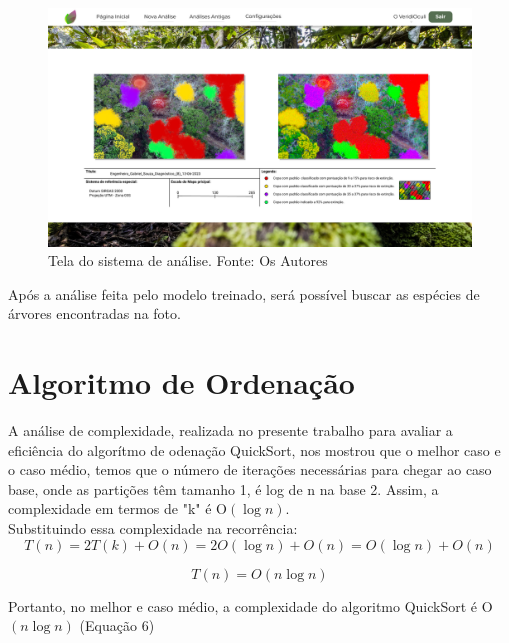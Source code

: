 \documentclass[
  a4paper,%
  12pt,%
  english,%
  brazilian,%
]{article}
\begin{document}
\begin{figure}[H]
    \centering
    \includegraphics[width=\textwidth,keepaspectratio]{Logos/tela_diagnostico_detalhado_novo.png}
    \caption{Tela do sistema de análise. Fonte: Os Autores}
    \label{fig:my_label}
\end{figure}

Após a análise feita pelo modelo treinado, será possível buscar as espécies de árvores encontradas na foto.


\section*{Algoritmo de Ordenação}
    

A análise de complexidade, realizada no presente trabalho para avaliar a eficiência do algorítmo de odenação QuickSort, nos mostrou que o melhor caso e o caso médio, temos que o número de iterações necessárias para chegar ao caso base, onde as partições têm tamanho 1, é log de n na base 2. Assim, a complexidade em termos de "k" é O$(\log n)$.\\

Substituindo essa complexidade na recorrência:\\

\begin{equation} 
\label{eu_eqn1}
        T(n) = 2T(k) + O(n) = 2O(\log n) + O(n) = O(\log n) + O(n)
\end{equation}

\begin{equation} 
    \label{eu_eqn}    
        T(n)= O(n \log n)
\end{equation}

Portanto, no melhor e caso médio, a complexidade do algoritmo QuickSort é O$(n \log n)$ (Equação 6)\\
\end{document}
